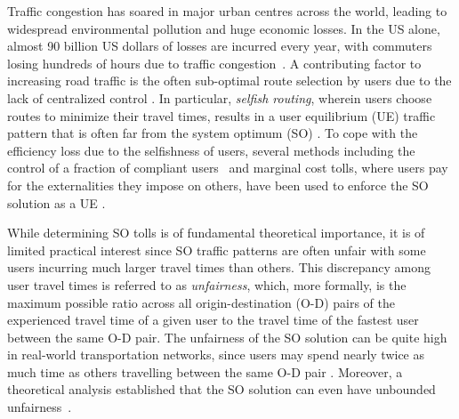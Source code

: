 \documentclass{article}
\newif\ifarxiv   %
\begin{document}
Traffic congestion has soared in major urban centres across the world, leading to widespread environmental pollution and huge economic losses. In the US alone, almost 90 billion US dollars of \ifarxiv economic \fi losses are incurred every year, with commuters losing hundreds of hours due to traffic congestion~\cite{us-congestion-costs}. A contributing factor to increasing road traffic \ifarxiv levels \fi is the often sub-optimal route selection by users due to the lack of centralized \ifarxiv traffic \fi control \cite{how-bad-is-selfish,ROUGHGARDEN2004389}. In particular, \textit{selfish routing}, wherein users choose routes to minimize their travel times, results in a user equilibrium (UE) traffic pattern that is often far from the system optimum (SO) \cite{Sheffi1985,boston-large-poa}. To cope with the efficiency loss due to the selfishness of users, several methods including the control of a fraction of compliant users~\cite{Sharon2018TrafficOF} and marginal cost tolls, where users pay for the externalities they impose on others, have been used to enforce the SO solution as a UE \cite{pigou,wardrop-ue}. 


While determining SO tolls is of fundamental theoretical importance, it is of limited practical interest \cite{METRP} since SO traffic patterns are often unfair with some users incurring much larger travel times than others. This discrepancy among user travel times is referred to as \textit{unfairness}, which, more formally, is the maximum possible ratio across all origin-destination (O-D) pairs of the experienced travel time of a given user to the travel time of the fastest user between the same O-D pair. The unfairness of the SO solution can be quite high in real-world transportation networks, since users may spend nearly twice as much time as others travelling between the same O-D pair \cite{so-routing-seminal}. Moreover, a theoretical analysis established that the SO solution can even have unbounded unfairness~\cite{Roughgarden2002HowUI}.
\end{document}

